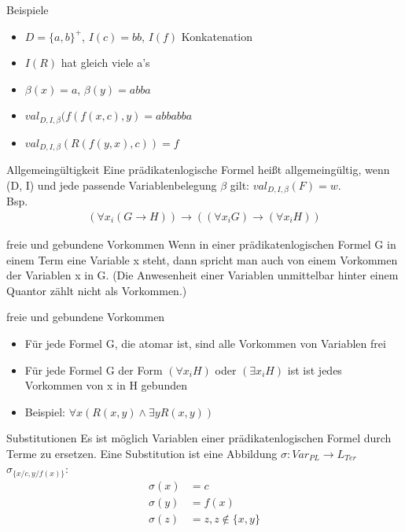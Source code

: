 \begin{frame}{Beispiele}
  \begin{itemize}
    \item $D=\{a,b\}^+$, $I(c)=bb$, $I(f)$ Konkatenation
    \item $I(R)$ hat gleich viele a's
    \item $\beta(x)=a$, $\beta(y)=abba$
    \item $val_{D,I,\beta}(f(f(x,c),y)=abbabba$
    \item $val_{D,I,\beta}(R(f(y,x),c))=f$
  \end{itemize}
\end{frame}

\begin{frame}{Allgemeingültigkeit}
  Eine prädikatenlogische Formel heißt allgemeingültig, wenn (D, I) und jede passende Variablenbelegung $\beta$ gilt: $val_{D,I,\beta}(F) = w$.\\
  Bsp.
  \begin{align*}
    (\forall x_i (G\rightarrow H)) \rightarrow((\forall x_i G) \rightarrow(\forall x_i H))
  \end{align*}
\end{frame}

\begin{frame}{freie und gebundene Vorkommen}
  Wenn in einer prädikatenlogischen Formel G in einem Term eine Variable x steht, dann spricht man auch von einem Vorkommen der Variablen x in G. (Die Anwesenheit einer Variablen unmittelbar hinter einem Quantor zählt nicht als Vorkommen.)
\end{frame}

\begin{frame}{freie und gebundene Vorkommen}
  \begin{itemize}
    \item Für jede Formel G, die atomar ist, sind alle Vorkommen von Variablen frei
    \item Für jede Formel G der Form $(\forall x_i H)$ oder $(\exists x_i H)$ ist ist jedes Vorkommen von x in H gebunden
    \item Beispiel: $\forall x(R(x,y)\land \exists y R(x,y))$
  \end{itemize}
\end{frame}

\begin{frame}{Substitutionen}
  Es ist möglich Variablen einer prädikatenlogischen Formel durch Terme zu ersetzen. Eine Substitution ist eine Abbildung $\sigma:Var_{PL}\rightarrow L_{Ter}$ \\
  $\sigma_{\{x/c,y/f(x)\}}$:
  \begin{align*}
    \sigma(x)&=c\\
    \sigma(y)&=f(x)\\
    \sigma(z)&=z , z\notin \{x,y\}
  \end{align*}
\end{frame}

